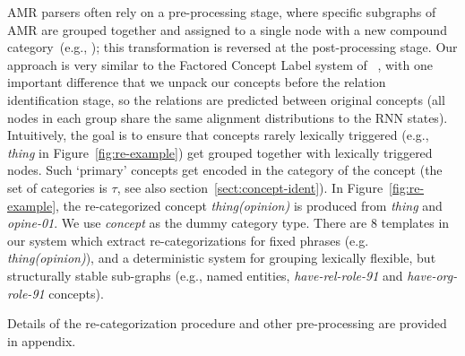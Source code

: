 \documentclass[11pt,a4paper]{article}
\begin{document}
AMR parsers often rely on a pre-processing stage, where specific subgraphs of AMR are grouped together and assigned to a single node with a new compound category~(e.g., ); this transformation is reversed at the post-processing stage. Our approach is very similar to the Factored Concept Label system of ~, with one important difference that we unpack our concepts before the relation identification stage, so the relations are predicted between original concepts (all nodes in each group share the same alignment distributions to the RNN states). Intuitively, the goal is to ensure that concepts rarely lexically triggered (e.g., \textit{thing} in Figure~\ref{fig:re-example}) get grouped together with lexically triggered nodes. Such `primary' concepts get encoded in the category of the concept (the set of categories is $\mathcal{\tau}$, see also section~\ref{sect:concept-ident}). In Figure~\ref{fig:re-example}, the re-categorized concept {\it thing(opinion)} is produced from {\it thing} and {\it opine-01}. We use \textit{concept} as the dummy category type.
There are 8 templates in our system which extract re-categorizations for fixed phrases (e.g. {\it thing(opinion)}), and a deterministic system for grouping lexically flexible, but structurally stable sub-graphs (e.g., named entities, {\it have-rel-role-91} and {\it have-org-role-91} concepts).

Details of the re-categorization procedure and other pre-processing are provided in appendix. 




\nocite{Pourdamghani2014AligningES,pennington2014glove,manning-EtAl:2014:P14-5}
\end{document}
